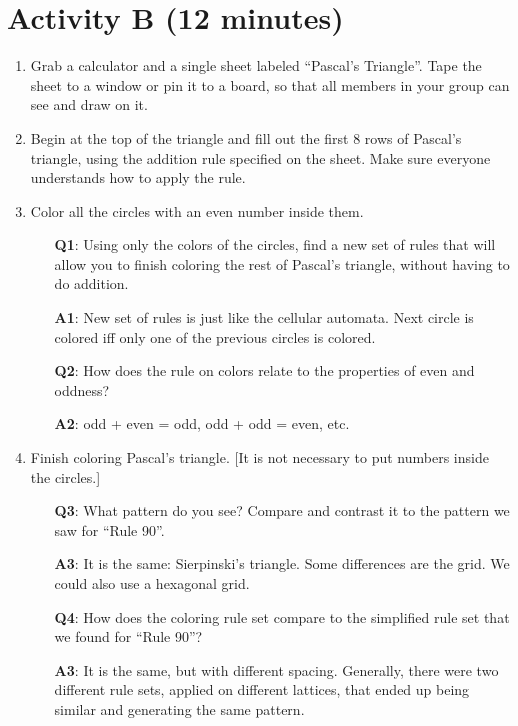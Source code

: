 \documentclass{article}
\begin{document}
\section*{Activity B (12 minutes)}

\begin{enumerate}
	\item Grab a calculator and a single sheet labeled ``Pascal's Triangle''.
	Tape the sheet to a window or pin it to a board, so that all members in your
	group can see and draw on it.

	\item Begin at the top of the triangle and fill out the first 8 rows of
	Pascal's triangle, using the addition rule specified on the sheet. Make sure
	everyone understands how to apply the rule.

	\item Color all the circles with an even number inside them.

	\begin{itemize}
		\item[\textbf{Q1}:] Using only the colors of the circles, find a
		new set of rules that will allow you to finish coloring the rest of
		Pascal's triangle, without having to do addition.

		\item[\textbf{A1}:] New set of rules is just like the cellular automata.
		Next circle is colored iff only one of the previous circles is colored.

		\item [\textbf{Q2}:] How does the rule on colors relate to the properties
		of even and oddness?

		\item[\textbf{A2}:] odd + even = odd, odd + odd = even, etc.
	\end{itemize}

	\item Finish coloring Pascal's triangle. [It is not necessary to put numbers
	inside the circles.]

	\begin{itemize}

		\item[\textbf{Q3}:] What pattern do you see? Compare and contrast it
		to the pattern we saw for ``Rule 90''.

		\item[\textbf{A3}:] It is the same: Sierpinski's triangle. Some differences
		are the grid. We could also use a hexagonal grid.

		\item[\textbf{Q4}:] How does the coloring rule set compare to the simplified
		rule set that we found for ``Rule 90''?

		\item[\textbf{A3}:] It is the same, but with different spacing. Generally,
		there were two different rule sets, applied on different lattices, that
		ended up being similar and generating the same pattern.


	\end{itemize}


\end{enumerate}
\end{document}
